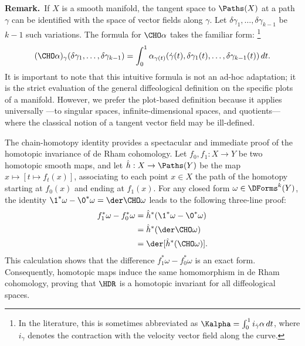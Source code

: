 \begin{article}
  \textbf{Remark.}~If $X$ is a smooth manifold,
  the tangent space to $\Paths(X)$ at a path $\gamma$ can be identified with the space of vector fields along $\gamma$.
  Let $\delta\gamma_1, \dots, \delta\gamma_{k-1}$ be $k-1$ such variations.
  The formula for $\CHO\alpha$ takes the familiar form:%
  \footnote{In the literature, this is sometimes abbreviated as $\Kalpha = \int_0^1 i_{\dot{\gamma}} \alpha \, dt$, where $i_{\dot{\gamma}}$ denotes the contraction with the velocity vector field along the curve.}
  \[
    (\CHO\alpha)_\gamma(\delta\gamma_1, \dots, \delta\gamma_{k-1}) = \int_0^1 \alpha_{\gamma(t)}(\dot{\gamma}(t), \delta\gamma_1(t), \dots, \delta\gamma_{k-1}(t)) \, dt.
    \]
  It is important to note that this intuitive formula is not an ad-hoc adaptation;
  it is the strict evaluation of the general diffeological definition on the specific plots of a manifold.
  However,
  we prefer the plot-based definition because it applies universally
  ---to singular spaces,
  infinite-dimensional spaces,
  and quotients---
  where the classical notion of a tangent vector field may be ill-defined.
\end{article}

\begin{article}
  The chain-homotopy identity provides a spectacular and immediate proof of the homotopic invariance of de Rham cohomology.
  Let $f_0, f_1: X \to Y$ be two homotopic smooth maps,
  and let $\hat{h}: X \to \Paths(Y)$ be the map $x \mapsto [t \mapsto f_t(x)]$,
  associating to each point $x \in X$ the path of the homotopy starting at $f_0(x)$ and ending at $f_1(x)$.
  For any closed form $\omega \in \DForms^k(Y)$,
  the identity $\1^*\omega - \0^*\omega = \der\CHO\omega$ leads to the following three-line proof:
  \begin{align*}
    f_1^*\omega - f_0^*\omega &= \hat{h}^*(\1^*\omega - \0^*\omega) \\
    &= \hat{h}^*(\der\CHO\omega) \\
    &= \der[\hat{h}^*(\CHO\omega)].
  \end{align*}
  This calculation shows that the difference $f_1^*\omega - f_0^*\omega$ is an exact form.
  Consequently,
  homotopic maps induce the same homomorphism in de Rham cohomology,
  proving that $\HDR$ is a homotopic invariant for all diffeological spaces.
\end{article}

